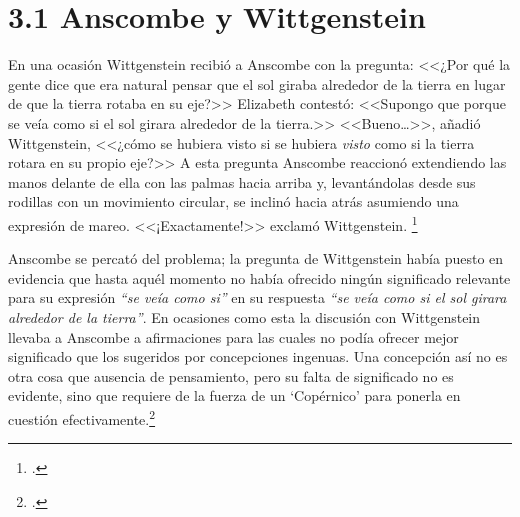 
\section{3.1 Anscombe y Wittgenstein}

En una ocasión Wittgenstein
recibió a Anscombe con la pregunta: <<¿Por qué la gente dice que era natural
pensar que el sol giraba alrededor de la tierra en lugar de que la tierra rotaba
en su eje?>> Elizabeth contestó: <<Supongo que porque se veía como si el sol
girara alrededor de la tierra.>> <<Bueno\ldots>>, añadió Wittgenstein, <<¿cómo
se hubiera visto si se hubiera \emph{visto} como si la tierra rotara en su
propio eje?>> A esta pregunta Anscombe reaccionó extendiendo las manos delante
de ella con las palmas hacia arriba y, levantándolas desde sus rodillas con un
movimiento circular, se inclinó hacia atrás asumiendo una expresión de mareo.
<<¡Exactamente!>> exclamó Wittgenstein. \footcite[cf.][151]{IWT} 

Anscombe se percató del problema; la
pregunta de Wittgenstein había puesto en evidencia que hasta aquél momento no
había ofrecido ningún significado relevante para su expresión \emph{``se veía como
si''} en su  respuesta \emph{``se veía como si el sol girara alrededor de la tierra''}. 
En ocasiones como esta la discusión con Wittgenstein llevaba a Anscombe a
afirmaciones para las cuales no podía ofrecer mejor significado que los
sugeridos por concepciones ingenuas. Una concepción así no es otra cosa que
ausencia de pensamiento, pero su falta de significado no es evidente, sino que
requiere de la fuerza de un `Copérnico' para ponerla en cuestión
efectivamente.\footcite[cf. 151]{IWT} 



